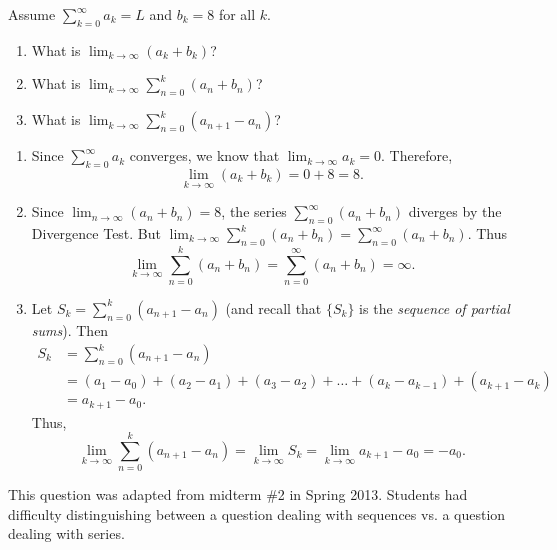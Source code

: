 \documentclass[]{ximera}
\begin{document}
\begin{problem}
Assume $\sum_{k=0}^\infty a_k =L$ and $b_k = 8$ for all $k$. 
	\begin{enumerate}
	
	\item  What is $\lim_{k \to \infty} (a_k + b_k)$?
	
	\item  What is $\lim_{k \to \infty} \sum_{n=0}^k (a_n + b_n)$?
	
	\item  What is $\lim_{k \to \infty} \sum_{n=0}^k (a_{n+1} - a_n)$?
	
	\end{enumerate}
	
	\begin{freeResponse}
		\begin{enumerate}
	
		\item  Since $\sum_{k=0}^\infty a_k$ converges, we know that $\lim_{k \to \infty} a_k = 0$.  
		Therefore,
			\[
			\lim_{k \to \infty} (a_k + b_k) = 0 + 8 = \boxed{8}.
			\]
	
		\item  Since $\lim_{n \to \infty} (a_n + b_n) = 8$, the series $\sum_{n=0}^\infty (a_n + b_n)$ diverges by the Divergence Test.  
		But $\lim_{k \to \infty}  \sum_{n=0}^k (a_n + b_n) = \sum_{n=0}^\infty (a_n + b_n)$.  
		Thus
			\[
			\lim_{k \to \infty}  \sum_{n=0}^k (a_n + b_n) = \sum_{n=0}^\infty (a_n + b_n) = \boxed{\infty}.
			\]
	
		\item  Let $S_k = \sum_{n=0}^k (a_{n+1} - a_n)$ (and recall that $\{ S_k \}$ is the {\it sequence of partial sums}).
		Then
			\begin{align*}
			S_k &= \sum_{n=0}^k (a_{n+1} - a_n)  \\
			&= (a_1 - a_0) + (a_2 - a_1) + (a_3 - a_2) + \hdots + (a_k - a_{k-1}) + (a_{k+1} - a_k)  \\
			&= a_{k+1} - a_0.
			\end{align*}
		Thus,
			\[
			\lim_{k \to \infty} \sum_{n=0}^k (a_{n+1} - a_n) = \lim_{k \to \infty} S_k = \lim_{k \to \infty} a_{k+1} - a_0 = \boxed{-a_0}.
			\]
	
		\end{enumerate}
	\end{freeResponse}
		
\end{problem}

\begin{instructorNotes}
This question was adapted from midterm \#2 in Spring 2013.  
Students had difficulty distinguishing between a question dealing with sequences vs. a question dealing with series.
\end{instructorNotes}
\end{document}
